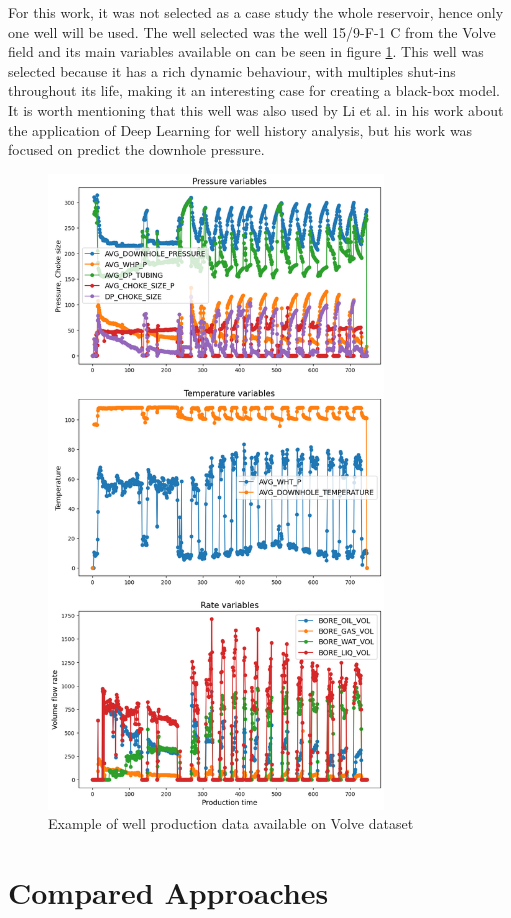 \documentclass[conference]{IEEEtran}
\begin{document}
For this work, it was not selected as a case study the whole reservoir, hence only one well 
will be used. The well selected was the well 15/9-F-1 C from the Volve field and its main 
variables available on can be seen in figure \ref{example_well}. This well was selected 
because it has a rich dynamic behaviour, with multiples shut-ins throughout its life, making 
it an interesting case for creating a black-box model. It is worth mentioning that this well 
was also used by Li et al. \cite{Li2019} in his work about the application of Deep Learning 
for well history analysis, but his work was focused on predict the downhole pressure.

\begin{figure}[htbp]
\centerline{\includegraphics[width=3.5in]{data_example_2.png}}
\caption{Example of well production data available on Volve dataset}
\label{example_well}
\end{figure}

\section{Compared Approaches}\label{sec:compared_approaches}
\end{document}
